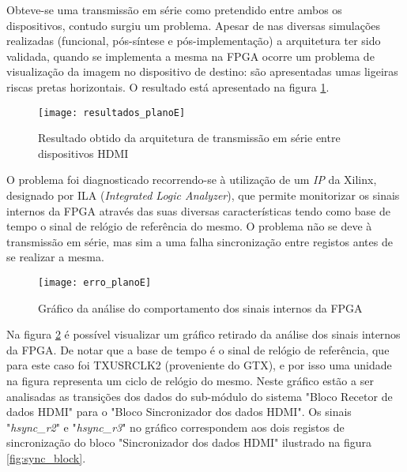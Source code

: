 
Obteve-se uma transmissão em série como pretendido entre ambos os dispositivos, contudo surgiu um problema. Apesar de nas diversas simulações realizadas (funcional, pós-síntese e pós-implementação) a arquitetura ter sido validada, quando se implementa a mesma na FPGA ocorre um problema de visualização da imagem no dispositivo de destino: são apresentadas umas ligeiras riscas pretas horizontais. O resultado está apresentado na figura \ref{fig:planoE_results}.


\begin{figure}
	\begin{center}
	\leavevmode
	\texttt{[image: resultados\_planoE]}
	\captionsetup{width=1.0\linewidth}
	\caption[Resultado obtido da arquitetura de transmissão em série entre dispositivos HDMI]{Resultado obtido da arquitetura de transmissão em série entre dispositivos HDMI}
	\label{fig:planoE_results}
\end{center}
\end{figure}

O problema foi diagnosticado recorrendo-se à utilização de um \textit{IP} da Xilinx, designado por ILA (\textit{Integrated Logic Analyzer}), que permite monitorizar os sinais internos da FPGA através das suas diversas características tendo como base de tempo o sinal de relógio de referência do mesmo. O problema não se deve à transmissão em série, mas sim a uma falha sincronização entre registos antes de se realizar a mesma.

\begin{figure}
	\begin{center}
		\leavevmode
		\texttt{[image: erro\_planoE]}
		\captionsetup{width=1.0\linewidth}
		\caption[Gráfico da análise do comportamento dos sinais internos da FPGA]{Gráfico da análise do comportamento dos sinais internos da FPGA}
		\label{fig:planoE_rerro}
	\end{center}
\end{figure}

Na figura \ref{fig:planoE_rerro} é possível visualizar um gráfico retirado da análise dos sinais internos da FPGA. De notar que a base de tempo é o sinal de relógio de referência, que para este caso foi TXUSRCLK2 (proveniente do GTX), e por isso uma unidade na figura representa um ciclo de relógio do mesmo.  Neste gráfico estão a ser analisadas as transições dos dados do sub-módulo do sistema "Bloco Recetor de dados HDMI" para o "Bloco Sincronizador dos dados HDMI". Os sinais "\textit{hsync\_r2}" e "\textit{hsync\_r3}" no gráfico correspondem aos dois registos de sincronização do bloco "Sincronizador dos dados HDMI" ilustrado na figura \ref{fig:sync_block}.

